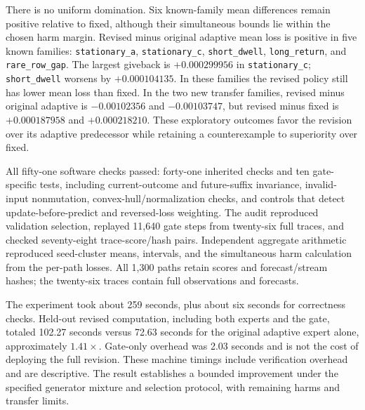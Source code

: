 There is no uniform domination. Six known-family mean differences remain positive relative to fixed, although their simultaneous bounds lie within the chosen harm margin. Revised minus original adaptive mean loss is positive in five known families: \texttt{stationary\_a}, \texttt{stationary\_c}, \texttt{short\_dwell}, \texttt{long\_return}, and \texttt{rare\_row\_gap}. The largest giveback is $+0.000299956$ in \texttt{stationary\_c}; \texttt{short\_dwell} worsens by $+0.000104135$. In these families the revised policy still has lower mean loss than fixed. In the two new transfer families, revised minus original adaptive is $-0.00102356$ and $-0.00103747$, but revised minus fixed is $+0.000187958$ and $+0.000218210$. These exploratory outcomes favor the revision over its adaptive predecessor while retaining a counterexample to superiority over fixed.

All fifty-one software checks passed: forty-one inherited checks and ten gate-specific tests, including current-outcome and future-suffix invariance, invalid-input nonmutation, convex-hull/normalization checks, and controls that detect update-before-predict and reversed-loss weighting. The audit reproduced validation selection, replayed 11,640 gate steps from twenty-six full traces, and checked seventy-eight trace-score/hash pairs. Independent aggregate arithmetic reproduced seed-cluster means, intervals, and the simultaneous harm calculation from the per-path losses. All 1,300 paths retain scores and forecast/stream hashes; the twenty-six traces contain full observations and forecasts.

The experiment took about 259 seconds, plus about six seconds for correctness checks. Held-out revised computation, including both experts and the gate, totaled 102.27 seconds versus 72.63 seconds for the original adaptive expert alone, approximately $1.41\times$. Gate-only overhead was 2.03 seconds and is not the cost of deploying the full revision. These machine timings include verification overhead and are descriptive. The result establishes a bounded improvement under the specified generator mixture and selection protocol, with remaining harms and transfer limits.


